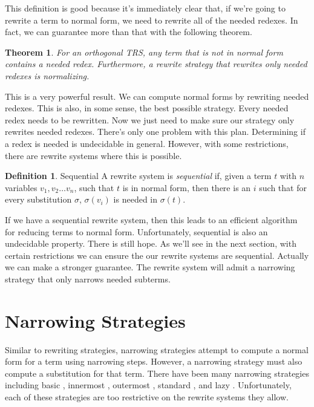 \documentclass{book}
\newtheorem{theorem}{Theorem}
\theoremstyle{definition}
\newtheorem{definition}{Definition}[section]
\begin{document}
This definition is good because it's immediately clear that, if we're going
to rewrite a term to normal form, we need to rewrite all of the needed redexes.
In fact, we can guarantee more than that with the following theorem.

\begin{theorem}
    For an orthogonal TRS, any term that is not in normal form contains a needed redex.
    Furthermore, a rewrite strategy that rewrites only needed redexes is normalizing.
\end{theorem}

This is a very powerful result.
We can compute normal forms by rewriting needed redexes.
This is also, in some sense, the best possible strategy.
Every needed redex needs to be rewritten.
Now we just need to make sure our strategy only rewrites needed redexes.
There's only one problem with this plan.
Determining if a redex is needed is undecidable in general.
However, with some restrictions, there are rewrite systems where this is possible.

\theoremstyle{definition}
\begin{definition}{Sequential}
    A rewrite system is \textit{sequential} if, given a term $t$ with $n$ variables $v_1,v_2\ldots v_n$,
    such that $t$ is in normal form,
    then there is an $i$ such that for every substitution $\sigma$, $\sigma(v_i)$ is needed in $\sigma(t)$.
\end{definition}

If we have a sequential rewrite system,
then this leads to an efficient algorithm for reducing terms to normal form.
Unfortunately, sequential is also an undecidable property.
There is still hope.
As we'll see in the next section,
with certain restrictions we can ensure the our rewrite systems are sequential.
Actually we can make a stronger guarantee.
The rewrite system will admit a narrowing strategy that only narrows needed subterms.

\section{Narrowing Strategies}

Similar to rewriting strategies, narrowing strategies attempt to compute a normal form
for a term using narrowing steps.
However, a narrowing strategy must also compute a substitution for that term.
There have been many narrowing strategies including basic \cite{basicNarrowing},
innermost \cite{slog}, outermost \cite{outerNarrowing},
standard \cite{standardNarrowing}, and lazy \cite{lazyNarrowing}.
Unfortunately, each of these strategies are too restrictive on the rewrite systems they allow.
\end{document}
